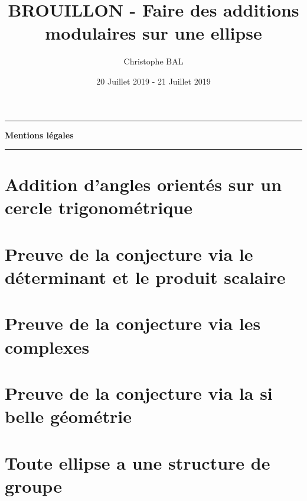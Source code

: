 \documentclass[12pt]{amsart}
\begin{document}
\title{BROUILLON - Faire des additions modulaires sur une ellipse}
\author{Christophe BAL}
\date{20 Juillet 2019 - 21 Juillet 2019}
\maketitle


\begin{center}
	\hrule\vspace{.3em}
	{
		\fontsize{1.35em}{1em}\selectfont
		\textbf{Mentions \og légales \fg}
	}
			
	\vspace{0.45em}
	\doclicenseThis
	\hrule
\end{center}



\setcounter{tocdepth}{2}
\tableofcontents




\newpage
\section{Addition d'angles orientés sur un cercle trigonométrique}





\section{Preuve de la conjecture via le déterminant et le produit scalaire} 





\section{Preuve de la conjecture via les complexes}
                        




\section{Preuve de la conjecture via la si belle géométrie} 




\section{Toute ellipse a une structure de groupe}
      

\end{document}
